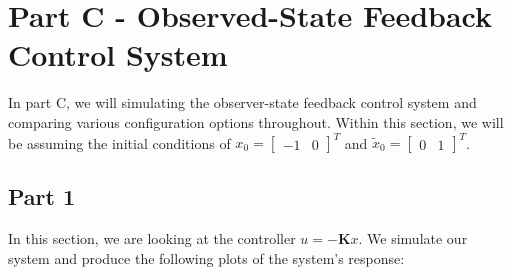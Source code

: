 \documentclass{article}
\begin{document}
\section*{Part C - Observed-State Feedback Control System}

In part C, we will simulating the observer-state feedback control system and comparing various configuration options throughout. Within this section, we will be assuming the initial conditions of $x_0 = \begin{bmatrix}-1 & 0\end{bmatrix}^T$ and $\tilde{x}_0 = \begin{bmatrix}0 & 1\end{bmatrix}^T$.

\subsection*{Part 1}

In this section, we are looking at the controller $u=-\boldsymbol{K}x$. We simulate our system and produce the following plots of the system's response:
\end{document}
